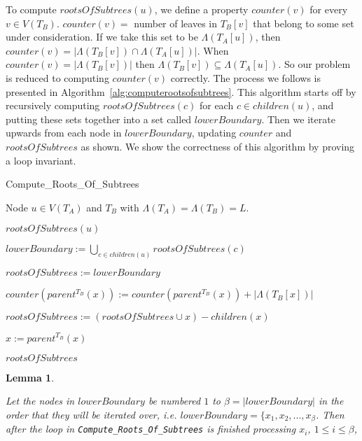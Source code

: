 \documentclass{article}
\newcommand{\leafset}{\Lambda}
\newtheorem{computerootsofsubtreescorrectness}[incompatibility]{Lemma}
\begin{document}
    To compute $rootsOfSubtrees(u)$, we define a property $counter(v)$ for every $v \in V(T_B)$. $counter(v) =$ number of leaves in $T_B[v]$ that belong to some set under consideration. If we take this set to be $\leafset(T_A[u])$, then $counter(v) = |\leafset(T_B[v]) \cap \leafset(T_A[u])|$. When $counter(v) = |\leafset(T_B[v])|$ then $\leafset(T_B[v]) \subseteq \leafset(T_A[u])$. So our problem is reduced to computing $counter(v)$ correctly. The process we follows is presented in Algorithm~\ref{alg:computerootsofsubtrees}. This algorithm starts off by recursively computing $rootsOfSubtrees(c)$ for each $c \in children(u)$, and putting these sets together into a set called $lowerBoundary$. Then we iterate upwards from each node in $lowerBoundary$, updating $counter$ and $rootsOfSubtrees$ as shown. We show the correctness of this algorithm by proving a loop invariant.\\

    \begin{algorithm}
        \caption{Compute\_Roots\_Of\_Subtrees}
        \label{alg:computerootsofsubtrees}

        \begin{algorithmic}[1]
            \Input Node $u \in V(T_A)$ and $T_B$ with $\leafset(T_A) = \leafset(T_B) = L$.

            \Output $rootsOfSubtrees(u)$

            \State $lowerBoundary := \bigcup_{c \in children(u)} rootsOfSubtrees(c)$

            \State $rootsOfSubtrees := lowerBoundary$

                \While{$counter(x) = |\leafset(T_B[x])|$}
                    \State $counter(parent^{T_B}(x)) := counter(parent^{T_B}(x)) + |\leafset(T_B[x])|$

                    \State $rootsOfSubtrees := (rootsOfSubtrees \cup {x}) - children(x)$

                    \State $x := parent^{T_B}(x)$
                \EndWhile
            \EndFor

            \Return $rootsOfSubtrees$
        \end{algorithmic}
    \end{algorithm}

    \begin{computerootsofsubtreescorrectness}
        \label{lem:computerootsofsubtreescorrectness}

        Let the nodes in $lowerBoundary$ be numbered $1$ to $\beta = |lowerBoundary|$ in the order that they will be iterated over, i.e. $lowerBoundary = \{x_1, x_2, ..., x_{\beta}$. Then after the loop in \texttt{Compute\_Roots\_Of\_Subtrees} is finished processing $x_i$, $1 \leq i \leq \beta$,
    \end{computerootsofsubtreescorrectness}
\end{document}
